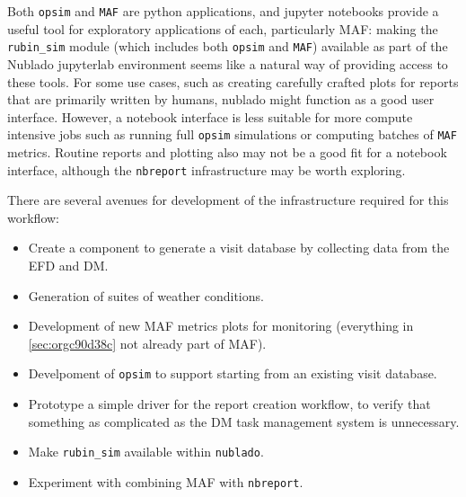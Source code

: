 Both \texttt{opsim} and \texttt{MAF} are python applications, and jupyter notebooks provide a useful tool for exploratory applications of each, particularly MAF: making the \texttt{rubin\_sim} module (which includes both \texttt{opsim} and \texttt{MAF}) available as part of the Nublado jupyterlab environment seems like a natural way of providing access to these tools. For some use cases, such as creating carefully crafted plots for reports that are primarily written by humans, nublado might function as a good user interface. However, a notebook interface is less suitable for more compute intensive jobs such as running full \texttt{opsim} simulations or computing batches of \texttt{MAF} metrics. Routine reports and plotting also may not be a good fit for a notebook interface, although the \texttt{nbreport} infrastructure may be worth exploring.

There are several avenues for development of the infrastructure required for this workflow:
\begin{itemize}
\item Create a component to generate a visit database by collecting data from the EFD and DM.
\item Generation of suites of weather conditions.
\item Development of new MAF metrics plots for monitoring (everything in \ref{sec:orgc90d38c} not already part of MAF).
\item Develpoment of \texttt{opsim} to support starting from an existing visit database.
\item Prototype a simple driver for the report creation workflow, to verify that something as complicated as the DM task management system is unnecessary.
\item Make \texttt{rubin\_sim} available within \texttt{nublado}.
\item Experiment with combining MAF with \texttt{nbreport}.
\end{itemize}
